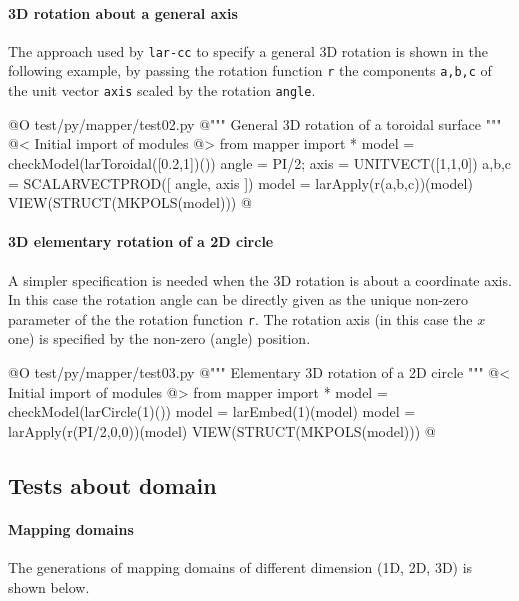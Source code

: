\documentclass[11pt,oneside]{article}	%
\begin{document}
\paragraph{3D rotation about a general axis}
The approach used by \texttt{lar-cc} to specify a general 3D rotation is shown in the following example,
by passing the rotation function \texttt{r} the components \texttt{a,b,c} of the unit vector \texttt{axis} scaled by the rotation \texttt{angle}. 

@O test/py/mapper/test02.py
@{""" General 3D rotation of a toroidal surface """
@< Initial import of modules @>
from mapper import *
model = checkModel(larToroidal([0.2,1])())
angle = PI/2; axis = UNITVECT([1,1,0])
a,b,c = SCALARVECTPROD([ angle, axis ])
model = larApply(r(a,b,c))(model)
VIEW(STRUCT(MKPOLS(model)))
@}


\paragraph{3D elementary rotation of a 2D circle}
A simpler specification is needed when the 3D rotation is about a coordinate axis. In this case the rotation angle can be directly given as the unique non-zero parameter of the the rotation function \texttt{r}. The rotation axis (in this case the $x$ one) is specified by the non-zero (angle) position.

@O test/py/mapper/test03.py
@{""" Elementary 3D rotation of a 2D circle """
@< Initial import of modules @>
from mapper import *
model = checkModel(larCircle(1)())
model = larEmbed(1)(model)
model = larApply(r(PI/2,0,0))(model)
VIEW(STRUCT(MKPOLS(model)))
@}




\subsection{Tests about domain}

\paragraph{Mapping domains}
The generations of mapping domains of different dimension (1D, 2D, 3D) is shown below.
	
\end{document}
